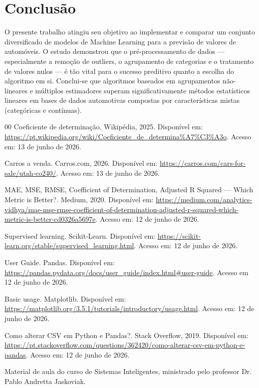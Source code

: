 \documentclass[conference]{IEEEtran}
\begin{document}
	\section{Conclusão}

		O presente trabalho atingiu seu objetivo ao implementar e comparar um conjunto diversificado de modelos de Machine Learning para a previsão de valores de automóveis. O estudo demonstrou que o pré-processamento de dados — especialmente a remoção de outliers, o agrupamento de categorias e o tratamento de valores nulos — é tão vital para o sucesso preditivo quanto a escolha do algoritmo em si. Conclui-se que algoritmos baseados em agrupamentos não-lineares e múltiplos estimadores superam significativamente métodos estatísticos lineares em bases de dados automotivas compostas por características mistas (categóricas e contínuas).

	\begin{thebibliography}{00}
		 Coeficiente de determinação. Wikipédia, 2025. Disponível em: \url{https://pt.wikipedia.org/wiki/Coeficiente_de_determina%A7%C3%A3o}. Acesso em: 13 de junho de 2026.

		 Carros a venda. Carros.com, 2026. Disponível em: \url{https://carros.com/cars-for-sale/utah-co240/}. Acesso em: 13 de junho de 2026.
		
		 MAE, MSE, RMSE, Coefficient of Determination, Adjusted R Squared — Which Metric is Better?. Medium, 2020. Disponível em: \url{https://medium.com/analytics-vidhya/mae-mse-rmse-coefficient-of-determination-adjusted-r-squared-which-metric-is-better-cd0326a5697e}. Acesso em: 12 de junho de 2026.

		 Supervised learning. Scikit-Learn. Disponível em: \url{https://scikit-learn.org/stable/supervised_learning.html}. Acesso em: 12 de junho de 2026.

		 User Guide. Pandas. Disponível em: \url{https://pandas.pydata.org/docs/user_guide/index.html#user-guide}. Acesso em 12 de junho de 2026.

		 Basic usage. Matplotlib. Disponível em: \url{https://matplotlib.org/3.5.1/tutorials/introductory/usage.html}. Acesso em: 12 de junho de 2026.

		 Como alterar CSV em Python e Pandas?. Stack Overflow, 2019. Disponível em: \url{https://pt.stackoverflow.com/questions/362420/como-alterar-csv-em-python-e-pandas}. Acesso em: 12 de junho de 2026.

		 Material de aula do curso de Sistemas Inteligentes, ministrado pelo professor Dr. Pablo Andretta Jaskoviak.
	\end{thebibliography}
\end{document}
